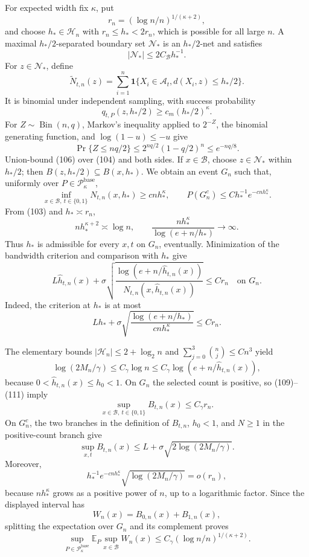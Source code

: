 For expected width fix \(\kappa\), put
\[
 r_n=(\log n/n)^{1/(\kappa+2)},
 \tag{103}
\]
and choose \(h_*\in\mathcal H_n\) with \(r_n\le h_*<2r_n\), which is
possible for all large \(n\).  A maximal \(h_*/2\)-separated boundary
set \(\mathcal N_*\) is an \(h_*/2\)-net and satisfies
\[
 |\mathcal N_*|\le2C_{\mathcal B}h_*^{-1}.
 \tag{104}
\]
For \(z\in\mathcal N_*\), define
\[
 \widetilde N_{t,n}(z)=\sum_{i=1}^n
 \mathbf1\{X_i\in\mathcal A_t, d(X_i,z)\le h_*/2\}.
\]
It is binomial under independent sampling, with success probability
\[
 q_{t,P}(z,h_*/2)\ge c_m(h_*/2)^\kappa.
 \tag{105}
\]
For \(Z\sim\operatorname{Bin}(n,q)\), Markov's inequality applied to
\(2^{-Z}\), the binomial generating function, and
\(\log(1-u)\le-u\) give
\[
 \Pr\{Z\le nq/2\}
 \le2^{nq/2}(1-q/2)^n
 \le e^{-nq/8}.
 \tag{106}
\]
Union-bound (106) over (104) and both sides.  If \(x\in\mathcal B\),
choose \(z\in\mathcal N_*\) within \(h_*/2\); then
\(B(z,h_*/2)\subseteq B(x,h_*)\).  We obtain an event \(G_n\) such that,
uniformly over \(P\in\mathcal P_\kappa^{\mathrm{base}}\),
\[
 \inf_{x\in\mathcal B,\ t\in\{0,1\}}N_{t,n}(x,h_*)
 \ge cnh_*^\kappa,
 \qquad
 P(G_n^c)\le Ch_*^{-1}e^{-cnh_*^\kappa}.
 \tag{107}
\]
From (103) and \(h_*\asymp r_n\),
\[
 nh_*^{\kappa+2}\asymp\log n,
 \qquad
 \frac{nh_*^\kappa}{\log(e+n/h_*)}\longrightarrow\infty.
 \tag{108}
\]
Thus \(h_*\) is admissible for every \(x,t\) on \(G_n\), eventually.
Minimization of the bandwidth criterion and comparison with \(h_*\)
give
\[
 L\widehat h_{t,n}(x)+
 \sigma\sqrt{\frac{\log(e+n/\widehat h_{t,n}(x))}
 {N_{t,n}(x,\widehat h_{t,n}(x))}}
 \le C r_n
 \quad\text{on }G_n.
 \tag{109}
\]
Indeed, the criterion at \(h_*\) is at most
\[
 Lh_*+\sigma\sqrt{\frac{\log(e+n/h_*)}{cnh_*^\kappa}}
 \le Cr_n.
 \tag{110}
\]

The elementary bounds \(|\mathcal H_n|\le2+\log_2n\) and
\(\sum_{j=0}^3\binom nj\le Cn^3\) yield
\[
 \log(2M_n/\gamma)\le C_\gamma\log n
 \le C_\gamma\log(e+n/\widehat h_{t,n}(x)),
 \tag{111}
\]
because \(0<\widehat h_{t,n}(x)\le h_0<1\).  On \(G_n\) the selected
count is positive, so (109)--(111) imply
\[
 \sup_{x\in\mathcal B,\ t\in\{0,1\}}B_{t,n}(x)
 \le C_\gamma r_n.
 \tag{112}
\]
On \(G_n^c\), the two branches in the definition of \(B_{t,n}\),
\(h_0<1\), and \(N\ge1\) in the positive-count branch give
\[
 \sup_{x,t}B_{t,n}(x)
 \le L+\sigma\sqrt{2\log(2M_n/\gamma)}.
 \tag{113}
\]
Moreover,
\[
 h_*^{-1}e^{-cnh_*^\kappa}
 \sqrt{\log(2M_n/\gamma)}=o(r_n),
 \tag{114}
\]
because \(nh_*^\kappa\) grows as a positive power of \(n\), up to a
logarithmic factor.  Since the displayed interval has
\[
 W_n(x)=B_{0,n}(x)+B_{1,n}(x),
 \tag{115}
\]
splitting the expectation over \(G_n\) and its complement proves
\[
 \sup_{P\in\mathcal P_\kappa^{\mathrm{base}}}
 \mathbb E_P\sup_{x\in\mathcal B}W_n(x)
 \le C_\gamma(\log n/n)^{1/(\kappa+2)}.
 \tag{116}
\]

